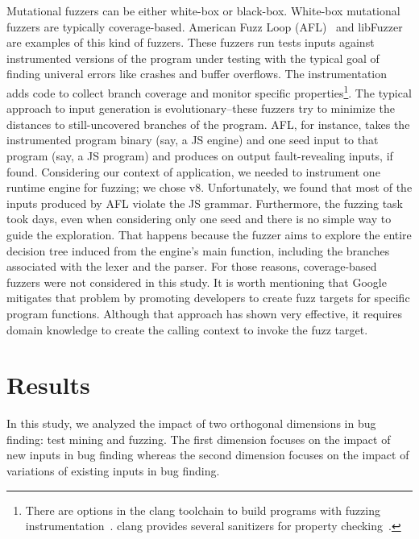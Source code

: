 \documentclass[10pt,conference,anonymous]{IEEEtran}
\begin{document}
Mutational fuzzers can be either white-box or
black-box. White-box mutational fuzzers are typically
coverage-based. American Fuzz Loop
(AFL)~\cite{afl} and libFuzzer~\cite{libfuzzer} are examples of
this kind of fuzzers. These fuzzers run tests inputs
against instrumented versions of the program under testing with the
typical goal of finding univeral errors like crashes and buffer
overflows. The instrumentation adds code to collect branch coverage and
monitor specific properties\footnote{There are options in the clang
  toolchain to build programs with fuzzing
  instrumentation~\cite{libfuzzer}. clang provides several sanitizers
  for property checking~\cite{clang-documentation}.}. The typical
approach to input generation is evolutionary--these fuzzers try to
minimize the distances to still-uncovered branches of the
program. AFL, for instance, takes the instrumented program binary
(say, a JS engine) and one seed input to that program (say, a JS
program) and produces on output fault-revealing inputs, if
found. Considering our context of application, we needed to instrument
one runtime engine for fuzzing; we chose v8. Unfortunately, we found
that most of the inputs produced by AFL violate the JS
grammar. Furthermore, the fuzzing task took days, even when considering
only one seed and there is no simple way to guide the
exploration. That happens because the fuzzer aims to explore the
entire decision tree induced from the engine's main function,
including the branches associated with the lexer and the parser. For
those reasons, coverage-based fuzzers were not considered in this
study. It is worth mentioning that Google mitigates that problem by
promoting developers to create fuzz targets for specific program
functions\cite{libFuzzer-tutorial-google,libFuzzer-chromium-google}. Although that approach has shown very effective,
it requires domain knowledge to create the calling context to invoke
the fuzz target.



\section{Results}
\label{sec:results}

In this study, we analyzed the impact of two orthogonal dimensions in
bug finding: test mining and fuzzing. The first dimension focuses on
the impact of new inputs in bug finding whereas the second dimension
focuses on the impact of variations of existing inputs in bug finding.
\end{document}

